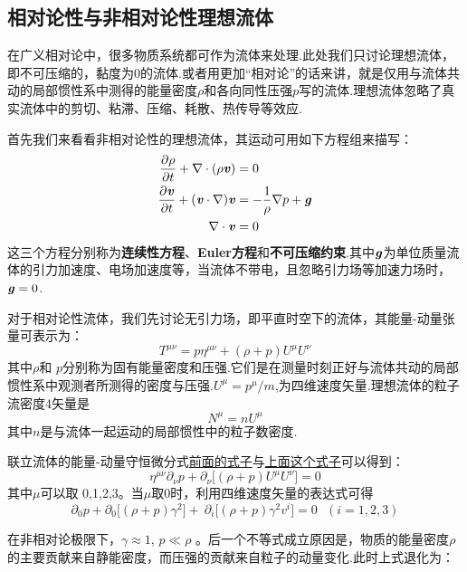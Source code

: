 \documentclass[a4paper]{book}
\newcommand{\xtjc}[1]{\textbf{\textit{#1}}}
\begin{document}
\begin{appendix}
\section{相对论性与非相对论性理想流体}
在广义相对论中，很多物质系统都可作为流体来处理.此处我们只讨论理想流体，即不可压缩的，黏度为0的流体.或者用更加“相对论”的话来讲，就是仅用与流体共动的局部惯性系中测得的能量密度$\rho$和各向同性压强$p$写的流体.理想流体忽略了真实流体中的剪切、粘滞、压缩、耗散、热传导等效应.\par 
首先我们来看看非相对论性的理想流体，其运动可用如下方程组来描写：
\begin{align}
\frac{\partial\rho}{\partial t}+\nabla \cdot(\rho \xtjc{v})&=0 \\
\frac{\partial\xtjc{v}}{\partial t}+(\xtjc{v}\cdot \nabla)\xtjc{v}&=-\frac{1}{\rho}\nabla p+\xtjc{g}\\
\nabla \cdot \xtjc{v}&=0
\end{align}
这三个方程分别称为\textbf{连续性方程}、\textbf{Euler方程}和\textbf{不可压缩约束}.其中$\xtjc{g}$为单位质量流体的引力加速度、电场加速度等，当流体不带电，且忽略引力场等加速力场时，$\xtjc{g}=0$.\par 
对于相对论性流体，我们先讨论无引力场，即平直时空下的流体，其能量-动量张量可表示为：
\begin{equation}\label{A.26}
	T^{\mu \nu }=p\eta^{\mu \nu }+(\rho +p)U^{\mu }U^{\nu}
\end{equation}
其中$\rho$和 $p$分别称为固有能量密度和压强.它们是在测量时刻正好与流体共动的局部惯性系中观测者所测得的密度与压强.$U^\mu=p^\mu/m$,为四维速度矢量.理想流体的粒子流密度4矢量是
\begin{equation}
	N^{\mu}=nU^{\mu}
\end{equation}
其中$ n $是与流体一起运动的局部惯性中的粒子数密度.\par 
联立流体的能量-动量守恒微分式\hyperref[A.17]{前面的式子}与\hyperref[A.26]{上面这个式子}可以得到：
\begin{equation}
	\eta^{\mu\nu}\partial_{\nu}p+\partial_{\nu}\Big[(\rho+p)U^{\mu}U^{\nu}\Big]=0 
\end{equation}
其中$\mu$可以取 0,1,2,3。当$\mu$取0时，利用四维速度矢量的表达式可得
\begin{equation}
\partial_{0}p+\partial_{0}\Big[(\rho+p)\gamma^{2}\Big]+\ \partial_{i}\Big[(\rho+p)\gamma^{2}v^{i}\Big]=0~~~(i=1,2,3)
\end{equation}\par 
在非相对论极限下，$\gamma\approx1$, $p\ll \rho$ 。后一个不等式成立原因是，物质的能量密度$\rho$的主要贡献来自静能密度，而压强的贡献来自粒子的动量变化.此时上式退化为：

\end{appendix}
\end{document}

